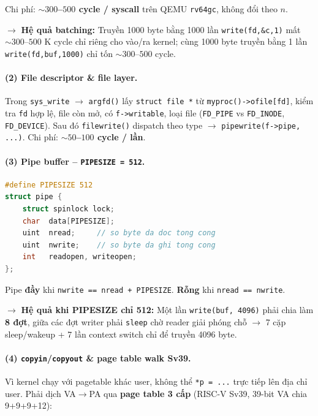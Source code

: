 \documentclass[11pt,a4paper]{article}
\begin{document}
Chi phí: \textbf{$\sim 300$--$500$ cycle / syscall} trên QEMU \texttt{rv64gc}, không đổi theo $n$.

$\rightarrow$ \textbf{Hệ quả batching:} Truyền 1000 byte bằng 1000 lần \texttt{write(fd,\&c,1)} mất $\sim 300$--$500$ K cycle chỉ riêng cho vào/ra kernel; cùng 1000 byte truyền bằng 1 lần \texttt{write(fd,buf,1000)} chỉ tốn $\sim 300$--$500$ cycle.

\paragraph{(2) File descriptor \& file layer.}
Trong \texttt{sys\_write} $\rightarrow$ \texttt{argfd()} lấy \texttt{struct file *} từ \texttt{myproc()->ofile[fd]}, kiểm tra \texttt{fd} hợp lệ, file còn mở, có \texttt{f->writable}, loại file (\texttt{FD\_PIPE} vs \texttt{FD\_INODE}, \texttt{FD\_DEVICE}). Sau đó \texttt{filewrite()} dispatch theo type $\rightarrow$ \texttt{pipewrite(f->pipe, ...)}. Chi phí: \textbf{$\sim 50$--$100$ cycle / lần}.

\paragraph{(3) Pipe buffer -- \texttt{PIPESIZE = 512}.}

\begin{lstlisting}[language=C]
#define PIPESIZE 512
struct pipe {
    struct spinlock lock;
    char  data[PIPESIZE];
    uint  nread;     // so byte da doc tong cong
    uint  nwrite;    // so byte da ghi tong cong
    int   readopen, writeopen;
};
\end{lstlisting}

Pipe \textbf{đầy} khi \texttt{nwrite == nread + PIPESIZE}. \textbf{Rỗng} khi \texttt{nread == nwrite}.

$\rightarrow$ \textbf{Hệ quả khi PIPESIZE chỉ 512:} Một lần \texttt{write(buf, 4096)} phải chia làm \textbf{8 đợt}, giữa các đợt writer phải \texttt{sleep} chờ reader giải phóng chỗ $\rightarrow$ 7 cặp sleep/wakeup + 7 lần context switch chỉ để truyền 4096 byte.

\paragraph{(4) \texttt{copyin}/\texttt{copyout} \& page table walk Sv39.}
Vì kernel chạy với pagetable khác user, không thể \texttt{*p = ...} trực tiếp lên địa chỉ user. Phải dịch VA$\rightarrow$PA qua \textbf{page table 3 cấp} (RISC-V Sv39, 39-bit VA chia 9+9+9+12):
\end{document}

